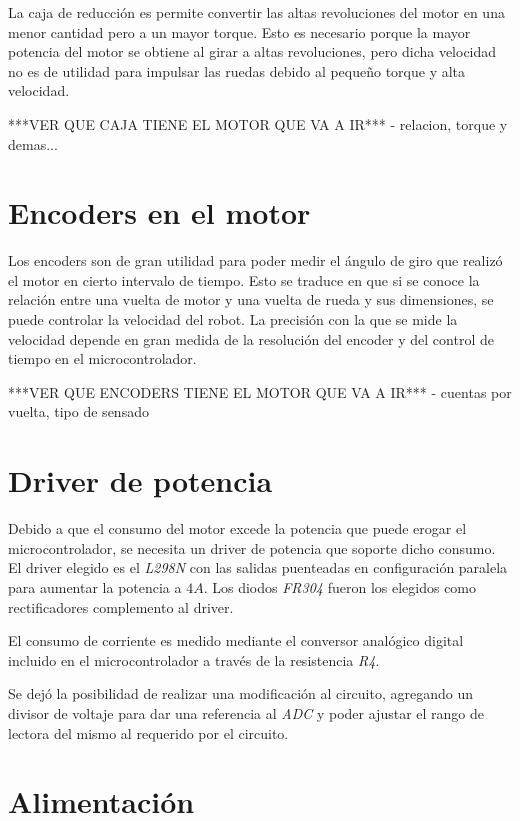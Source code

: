 \documentclass[a4paper,10pt]{article}
\begin{document}
La caja de reducci\'on es permite convertir las altas revoluciones del motor en una menor cantidad pero a un mayor torque.
Esto es necesario porque la mayor potencia del motor se obtiene al girar a altas revoluciones, pero dicha velocidad no es de utilidad
para impulsar las ruedas debido al peque\~no torque y alta velocidad.

***VER QUE CAJA TIENE EL MOTOR QUE VA A IR*** - relacion, torque y demas...

\section{Encoders en el motor}
\label{encoders}

Los encoders son de gran utilidad para poder medir el \'angulo de giro que realiz\'o el motor en cierto intervalo de tiempo.
Esto se traduce en que si se conoce la relaci\'on entre una vuelta de motor y una vuelta de rueda y sus dimensiones,
se puede controlar la velocidad del robot. La precisi\'on con la que se mide la velocidad depende en gran medida de la resoluci\'on
del encoder y del control de tiempo en el microcontrolador.

***VER QUE ENCODERS TIENE EL MOTOR QUE VA A IR*** - cuentas por vuelta, tipo de sensado

\section{Driver de potencia}
\label{driver}

Debido a que el consumo del motor excede la potencia que puede erogar el microcontrolador, se necesita un driver de potencia que soporte dicho consumo.
El driver elegido es el \emph{L298N} con las salidas puenteadas en configuraci\'on paralela para aumentar la potencia a $4A$. Los diodos \emph{FR304}
fueron los elegidos como rectificadores complemento al driver.

El consumo de corriente es medido mediante el conversor anal\'ogico digital incluido en el microcontrolador a trav\'es de la resistencia \emph{R4}.

Se dej\'o la posibilidad de realizar una modificaci\'on al circuito, agregando un divisor de voltaje para dar una referencia al \emph{ADC} y poder ajustar
el rango de lectora del mismo al requerido por el circuito.

\section{Alimentaci\'on}
\label{alimentacion}
\end{document}
